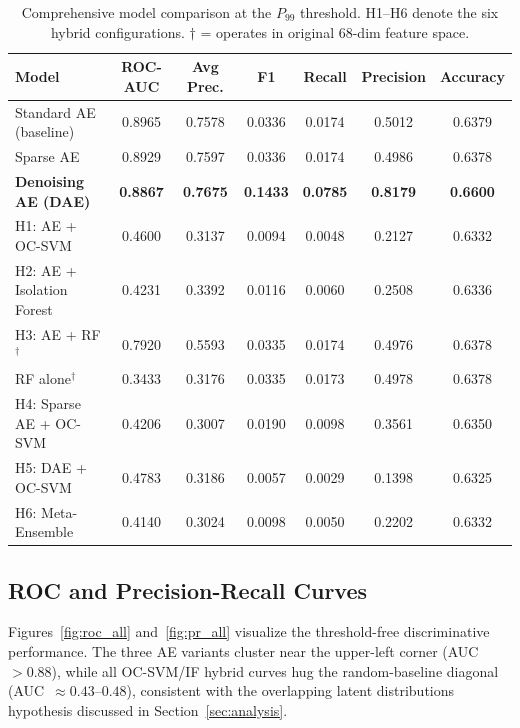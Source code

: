 \documentclass[10pt,journal,compsoc]{IEEEtran}
\begin{document}
\begin{table}[htbp]
\centering
\caption{Comprehensive model comparison at the $P_{99}$ threshold.
  H1--H6 denote the six hybrid configurations.
  $\dagger$ = operates in original 68-dim feature space.}
\label{tab:comparison}
\begin{tabular}{lcccccc}
\toprule
\textbf{Model} & \textbf{ROC-AUC} & \textbf{Avg Prec.} & \textbf{F1} & \textbf{Recall} & \textbf{Precision} & \textbf{Accuracy} \\
\midrule
Standard AE (baseline)      & 0.8965 & 0.7578 & 0.0336 & 0.0174 & 0.5012 & 0.6379 \\
Sparse AE                   & 0.8929 & 0.7597 & 0.0336 & 0.0174 & 0.4986 & 0.6378 \\
\textbf{Denoising AE (DAE)} & \textbf{0.8867} & \textbf{0.7675} & \textbf{0.1433} & \textbf{0.0785} & \textbf{0.8179} & \textbf{0.6600} \\
H1: AE + OC-SVM             & 0.4600 & 0.3137 & 0.0094 & 0.0048 & 0.2127 & 0.6332 \\
H2: AE + Isolation Forest   & 0.4231 & 0.3392 & 0.0116 & 0.0060 & 0.2508 & 0.6336 \\
H3: AE + RF$^\dagger$       & 0.7920 & 0.5593 & 0.0335 & 0.0174 & 0.4976 & 0.6378 \\
RF alone$^\dagger$           & 0.3433 & 0.3176 & 0.0335 & 0.0173 & 0.4978 & 0.6378 \\
H4: Sparse AE + OC-SVM      & 0.4206 & 0.3007 & 0.0190 & 0.0098 & 0.3561 & 0.6350 \\
H5: DAE + OC-SVM            & 0.4783 & 0.3186 & 0.0057 & 0.0029 & 0.1398 & 0.6325 \\
H6: Meta-Ensemble           & 0.4140 & 0.3024 & 0.0098 & 0.0050 & 0.2202 & 0.6332 \\
\bottomrule
\end{tabular}
\end{table}

\subsection{ROC and Precision-Recall Curves}

Figures~\ref{fig:roc_all} and~\ref{fig:pr_all} visualize the
threshold-free discriminative performance.  The three AE variants
cluster near the upper-left corner (AUC $>0.88$), while all
OC-SVM/IF hybrid curves hug the random-baseline diagonal (AUC~$\approx
0.43$--$0.48$), consistent with the overlapping latent distributions
hypothesis discussed in Section~\ref{sec:analysis}.
\end{document}
